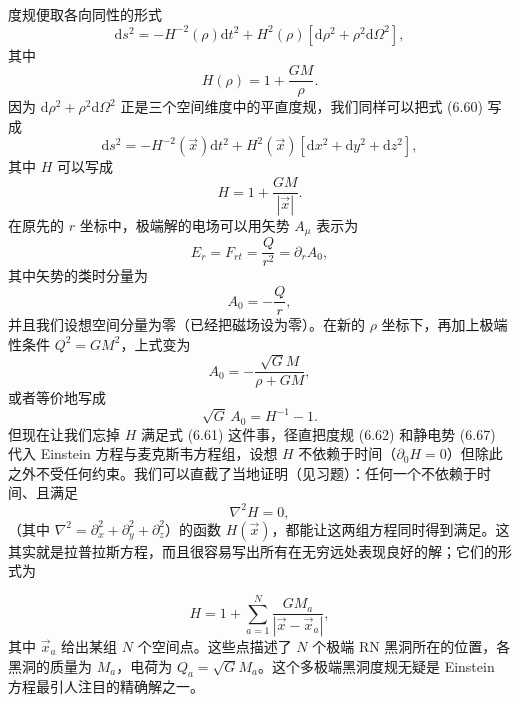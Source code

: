度规便取各向同性的形式
\begin{equation*}
\mathrm{d}s^{2} = -H^{-2}(\rho)\mathrm{d}t^{2} + H^{2}(\rho)\left[\mathrm{d}\rho^{2} + \rho^{2}\mathrm{d}\Omega^{2}\right],
\tag{6.60}
\end{equation*}
其中
\begin{equation*}
H(\rho) = 1 + \frac{GM}{\rho}.
\tag{6.61}
\end{equation*}
因为 $\mathrm{d}\rho^{2}+\rho^{2}\mathrm{d}\Omega^{2}$ 正是三个空间维度中的平直度规，我们同样可以把式 (6.60) 写成
\begin{equation*}
\mathrm{d}s^{2} = -H^{-2}(\vec{x})\mathrm{d}t^{2} + H^{2}(\vec{x})\left[\mathrm{d}x^{2} + \mathrm{d}y^{2} + \mathrm{d}z^{2}\right],
\tag{6.62}
\end{equation*}
其中 $H$ 可以写成
\begin{equation*}
H = 1 + \frac{GM}{|\vec{x}|}.
\tag{6.63}
\end{equation*}
在原先的 $r$ 坐标中，极端解的电场可以用矢势 $A_{\mu}$ 表示为
\begin{equation*}
E_{r} = F_{rt} = \frac{Q}{r^{2}} = \partial_{r}A_{0},
\tag{6.64}
\end{equation*}
其中矢势的类时分量为
\begin{equation*}
A_{0} = -\frac{Q}{r},
\tag{6.65}
\end{equation*}
并且我们设想空间分量为零（已经把磁场设为零）。在新的 $\rho$ 坐标下，再加上极端性条件 $Q^{2}=GM^{2}$，上式变为
\begin{equation*}
A_{0} = -\frac{\sqrt{G}M}{\rho+GM},
\tag{6.66}
\end{equation*}
或者等价地写成
\begin{equation*}
\sqrt{G}\,A_{0} = H^{-1}-1.
\tag{6.67}
\end{equation*}
但现在让我们忘掉 $H$ 满足式 (6.61) 这件事，径直把度规 (6.62) 和静电势 (6.67) 代入 Einstein 方程与麦克斯韦方程组，设想 $H$ 不依赖于时间（$\partial_{0}H=0$）但除此之外不受任何约束。我们可以直截了当地证明（见习题）：任何一个不依赖于时间、且满足
\begin{equation*}
\nabla^{2}H = 0,
\tag{6.68}
\end{equation*}
（其中 $\nabla^{2}=\partial_{x}^{2}+\partial_{y}^{2}+\partial_{z}^{2}$）的函数 $H(\vec{x})$，都能让这两组方程同时得到满足。这其实就是拉普拉斯方程，而且很容易写出所有在无穷远处表现良好的解；它们的形式为

\begin{equation*}
H = 1 + \sum_{a=1}^{N}\frac{GM_{a}}{|\vec{x}-\vec{x}_{a}|},
\tag{6.69}
\end{equation*}
其中 $\vec{x}_{a}$ 给出某组 $N$ 个空间点。这些点描述了 $N$ 个极端 RN 黑洞所在的位置，各黑洞的质量为 $M_{a}$，电荷为 $Q_{a}=\sqrt{G}M_{a}$。这个多极端黑洞度规无疑是 Einstein 方程最引人注目的精确解之一。

